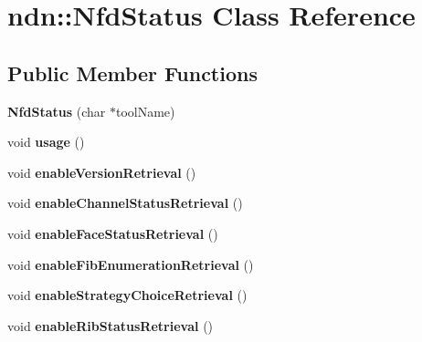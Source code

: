 \hypertarget{classndn_1_1NfdStatus}{}\section{ndn\+:\+:Nfd\+Status Class Reference}
\label{classndn_1_1NfdStatus}
\subsection*{Public Member Functions}
\begin{DoxyCompactItemize}
\item 
{\bfseries Nfd\+Status} (char $\ast$tool\+Name)\hypertarget{classndn_1_1NfdStatus_aab3e3014e7a3ba6074c07def3de013ba}{}\label{classndn_1_1NfdStatus_aab3e3014e7a3ba6074c07def3de013ba}

\item 
void {\bfseries usage} ()\hypertarget{classndn_1_1NfdStatus_a67501d731f1b0000f1f2c47439bcc7d8}{}\label{classndn_1_1NfdStatus_a67501d731f1b0000f1f2c47439bcc7d8}

\item 
void {\bfseries enable\+Version\+Retrieval} ()\hypertarget{classndn_1_1NfdStatus_a6da64bce63fd005c79c6fcaabb7a1302}{}\label{classndn_1_1NfdStatus_a6da64bce63fd005c79c6fcaabb7a1302}

\item 
void {\bfseries enable\+Channel\+Status\+Retrieval} ()\hypertarget{classndn_1_1NfdStatus_ae7ff37bff0a45833cced149eafd6fb60}{}\label{classndn_1_1NfdStatus_ae7ff37bff0a45833cced149eafd6fb60}

\item 
void {\bfseries enable\+Face\+Status\+Retrieval} ()\hypertarget{classndn_1_1NfdStatus_a5bf1ec5bfa4514cc04666f21e629f3d7}{}\label{classndn_1_1NfdStatus_a5bf1ec5bfa4514cc04666f21e629f3d7}

\item 
void {\bfseries enable\+Fib\+Enumeration\+Retrieval} ()\hypertarget{classndn_1_1NfdStatus_a27ce79e71b5058701235e0ab48979e92}{}\label{classndn_1_1NfdStatus_a27ce79e71b5058701235e0ab48979e92}

\item 
void {\bfseries enable\+Strategy\+Choice\+Retrieval} ()\hypertarget{classndn_1_1NfdStatus_aabf25b03b3d3265da0d689a090e4ec69}{}\label{classndn_1_1NfdStatus_aabf25b03b3d3265da0d689a090e4ec69}

\item 
void {\bfseries enable\+Rib\+Status\+Retrieval} ()\hypertarget{classndn_1_1NfdStatus_a6451a0b347fc42fbb56749e9cc6a2cf4}{}\label{classndn_1_1NfdStatus_a6451a0b347fc42fbb56749e9cc6a2cf4}


\end{DoxyCompactItemize}
